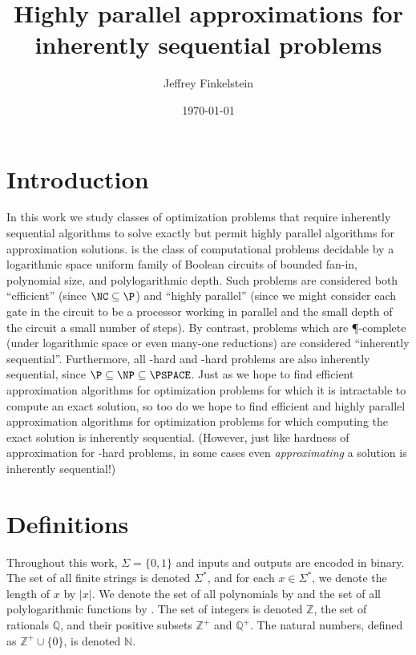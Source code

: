 \documentclass[]{article}
\author{Jef{}frey Finkelstein}
\date{\today}
\title{Highly parallel approximations for inherently sequential problems}
\begin{document}
\maketitle

\section{Introduction}

In this work we study classes of optimization problems that require inherently sequential algorithms to solve exactly but permit highly parallel algorithms for approximation solutions.
\NC{} is the class of computational problems decidable by a logarithmic space uniform family of Boolean circuits of bounded fan-in, polynomial size, and polylogarithmic depth.
Such problems are considered both ``efficient'' (since $\NC \subseteq \P$) and ``highly parallel'' (since we might consider each gate in the circuit to be a processor working in parallel and the small depth of the circuit a small number of steps).
By contrast, problems which are \P-complete (under logarithmic space or even \NC{} many-one reductions) are considered ``inherently sequential''.
Furthermore, all \NP-hard and \PSPACE-hard problems are also inherently sequential, since $\P \subseteq \NP \subseteq \PSPACE$.
Just as we hope to find efficient approximation algorithms for optimization problems for which it is intractable to compute an exact solution, so too do we hope to find efficient and highly parallel approximation algorithms for optimization problems for which computing the exact solution is inherently sequential.
(However, just like hardness of approximation for \NP-hard problems, in some cases even \emph{approximating} a solution is inherently sequential!)

\section{Definitions}

Throughout this work, $\Sigma=\{0, 1\}$ and inputs and outputs are encoded in binary.
The set of all finite strings is denoted $\Sigma^*$, and for each $x \in \Sigma^*$, we denote the length of $x$ by $|x|$.
We denote the set of all polynomials by \poly{} and the set of all polylogarithmic functions by \polylog.
The set of integers is denoted $\mathbb{Z}$, the set of rationals $\mathbb{Q}$, and their positive subsets $\mathbb{Z}^+$ and $\mathbb{Q}^+$.
The natural numbers, defined as $\mathbb{Z}^+ \cup \{0\}$, is denoted $\mathbb{N}$.
\end{document}
